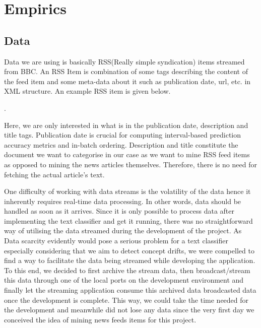 \documentclass[12pt]{article}
\begin{document}
\section{Empirics}
\subsection{Data}
Data we are using is basically RSS(Really simple syndication) items streamed from BBC. An RSS Item is combination of some tags describing the content of the feed item and some meta-data about it such as publication date, url, etc. in XML structure. An example RSS item is given below.

    .

Here, we are only interested in what is in the publication date, description and title tags. Publication date is crucial for computing interval-based prediction accuracy metrics and in-batch ordering. Description and title constitute the document we want to categorise in our case as we want to mine RSS feed items as opposed to mining the news articles themselves. Therefore, there is no need for fetching the actual article's text.


One difficulty of working with data streams is the volatility of the data hence it inherently requires real-time data processing. In other words,  data should be handled as soon as it arrives. Since it is only possible to process data after implementing the text classifier and get it running, there was no straightforward way of utilising the data streamed during the development of the project. As Data scarcity evidently would pose a serious problem for a text classifier especially considering that we aim to detect concept drifts, we were compelled to find a way to facilitate the data being streamed while developing the application. To this end, we decided to first archive the stream data, then broadcast/stream this data through one of the local ports on the development environment and finally let the streaming application consume this archived data broadcasted data once the development is complete. This way, we could take the time needed for the development and meanwhile did not lose any data since the very first day we conceived the idea of mining news feeds items for this project.
\end{document}
